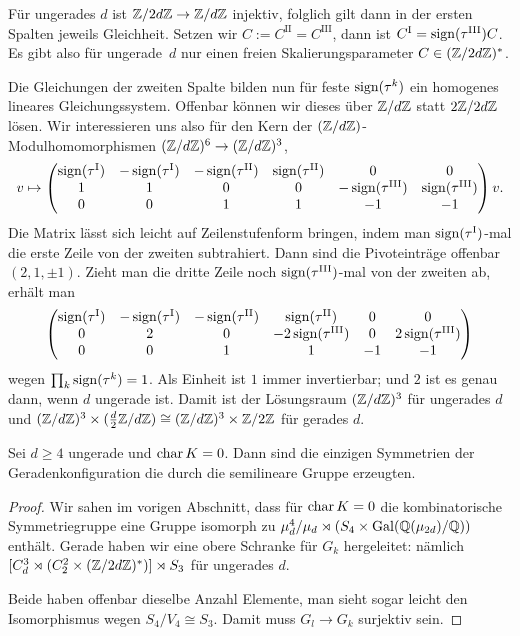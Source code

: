 Für ungerades $d$ ist $\Zmod 2dZ \to \Zmod dZ$ injektiv, folglich gilt dann in der ersten Spalten jeweils Gleichheit. Setzen wir $C := C^\mathrm{II} = C^\mathrm{III}$, dann ist $C^\mathrm{I} = \operatorname{sign}(\tau^\mathrm{III}) C$. Es gibt also für ungerade~$d$ nur einen freien Skalierungsparameter $C \in (\Zmod 2dZ)^*$.

Die Gleichungen der zweiten Spalte bilden nun für feste $\operatorname{sign}(\tau^k)$ ein homogenes lineares Gleichungssystem. Offenbar können wir dieses über $\Zmod dZ$ statt $2\Zmod 2dZ$ lösen. Wir interessieren uns also für den Kern der $(\Zmod dZ)$-Modulhomomorphismen $(\Zmod dZ)^6 \to (\Zmod dZ)^3$,
\begin{equation}
v \mapsto
\begin{pmatrix}
\operatorname{sign}(\tau^\mathrm{I}) & -\operatorname{sign}(\tau^\mathrm{I}) & -\operatorname{sign}(\tau^\mathrm{II}) & \operatorname{sign}(\tau^\mathrm{II}) & 0 & 0 \\
1 & 1 & 0 & 0 & -\operatorname{sign}(\tau^\mathrm{III}) & \operatorname{sign}(\tau^\mathrm{III}) \\
0 & 0 & 1 & 1 & -1 & -1
\end{pmatrix}v.
\end{equation}
Die Matrix lässt sich leicht auf Zeilenstufenform bringen, indem man $\operatorname{sign}(\tau^\mathrm{I})$-mal die erste Zeile von der zweiten subtrahiert. Dann sind die Pivoteinträge offenbar $(2,1,\pm 1)$. Zieht man die dritte Zeile noch $\operatorname{sign}(\tau^\mathrm{III})$-mal von der zweiten ab, erhält man
\begin{equation*}
\begin{pmatrix}
\operatorname{sign}(\tau^\mathrm{I}) & -\operatorname{sign}(\tau^\mathrm{I}) & -\operatorname{sign}(\tau^\mathrm{II}) & \operatorname{sign}(\tau^\mathrm{II}) & 0 & 0 \\
0 & 2 & 0 & -2\operatorname{sign}(\tau^\mathrm{III}) & 0 & 2\operatorname{sign}(\tau^\mathrm{III}) \\
0 & 0 & 1 & 1 & -1 & -1
\end{pmatrix}
\end{equation*}
wegen $\prod_k \operatorname{sign}(\tau^k) = 1$. Als Einheit ist $1$ immer invertierbar; und $2$ ist es genau dann, wenn $d$ ungerade ist. Damit ist der Lösungsraum $(\Zmod dZ)^3$ für ungerades $d$ und $(\Zmod dZ)^3 \times (\frac d2\Zmod dZ) \cong (\Zmod dZ)^3 \times \Zmod 2Z$ für gerades $d$.

\begin{theorem}
Sei $d \geq 4$ ungerade und $\operatorname{char} K=0$. Dann sind die einzigen Symmetrien der Geradenkonfiguration die durch die semilineare Gruppe erzeugten.
\end{theorem}
\begin{proof}
Wir sahen im vorigen Abschnitt, dass für $\operatorname{char} K=0$ die kombinatorische Symmetriegruppe eine Gruppe isomorph zu $\mu_d^4 / \mu_d \rtimes (S_4 \times \Gal \mathbb Q(\mu_{2d})/{\mathbb Q})$ enthält. Gerade haben wir eine obere Schranke für $G_k$ hergeleitet: nämlich $[C_d^3 \rtimes (C_2^2 \times (\Zmod 2dZ)^*)] \rtimes S_3$ für ungerades $d$.

Beide haben offenbar dieselbe Anzahl Elemente, man sieht sogar leicht den Isomorphismus wegen $S_4/V_4 \cong S_3$. Damit muss $G_l \to G_k$ surjektiv sein.
\end{proof}

